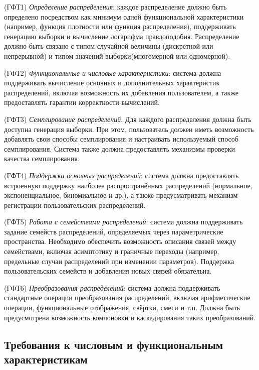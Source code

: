 \begin{itemizecmp}
    \item[(ГФТ1)] \textit{Определение распределения}: каждое распределение должно быть определено посредством как минимум одной функциональной характеристики (например, функция плотности или функция распределения), поддерживать генерацию выборки и вычисление логарифма правдоподобия. Распределение должно быть связано с типом случайной величины (дискретной или непрерывной) и типом значений выборки(многомерной или одномерной).
    \item[(ГФТ2)] \textit{Функциональные и числовые характеристики}: система должна поддерживать вычисление основных и дополнительных характеристик распределений, включая возможность их  добавления пользователем, а также предоставлять гарантии корректности вычислений.
    \item[(ГФТ3)] \textit{Семплирование распределений}. Для каждого распределения должна быть доступна генерация выборки. При этом, пользователь должен иметь возможность добавлять свои способы семплирования и настраивать используемый способ семплирования. Система также должна предоставлять механизмы проверки качества семплирования.
    \item[(ГФТ4)] \textit{Поддержка основных распределений}: система должна предоставлять встроенную поддержку наиболее распространённых распределений (нормальное, экспоненциальное, биномиальное и др.), а также предусматривать механизм регистрации пользовательских распределений.
    \item[(ГФТ5)] \textit{Работа с семействами распределений}: система должна поддерживать задание семейств распределений, определяемых через параметрические пространства. Необходимо обеспечить возможность описания связей между семействами, включая асимптотику и граничные переходы (например, предельные случаи распределений при изменении параметров). Поддержка пользовательских семейств и добавления новых связей обязательна.

    \item[(ГФТ6)] \textit{Преобразования распределений}: система должна поддерживать стандартные операции преобразования распределений, включая арифметические операции, функциональные отображения, свёртки, смеси и т.п. Должна быть предусмотрена возможность компоновки и каскадирования таких преобразований.
\end{itemizecmp}


\subsection{Требования к числовым и функциональным характеристикам}

